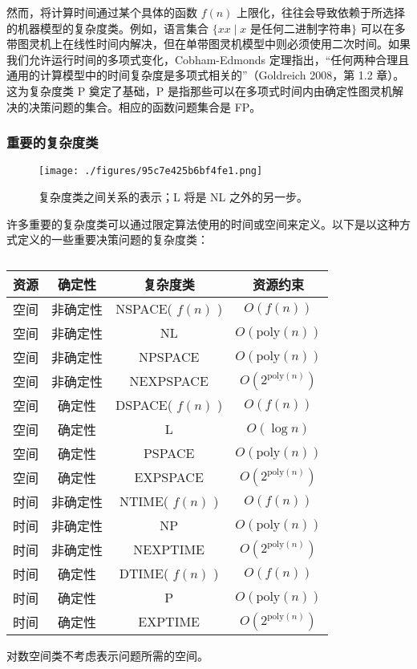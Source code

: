 然而，将计算时间通过某个具体的函数 \( f(n) \) 上限化，往往会导致依赖于所选择的机器模型的复杂度类。例如，语言集合 \(\{xx \mid x \text{ 是任何二进制字符串} \}\) 可以在多带图灵机上在线性时间内解决，但在单带图灵机模型中则必须使用二次时间。如果我们允许运行时间的多项式变化，Cobham-Edmonds 定理指出，“任何两种合理且通用的计算模型中的时间复杂度是多项式相关的”（Goldreich 2008，第 1.2 章）。这为复杂度类 P 奠定了基础，P 是指那些可以在多项式时间内由确定性图灵机解决的决策问题的集合。相应的函数问题集合是 FP。
\subsubsection{重要的复杂度类}
\begin{figure}[ht]
\centering
\texttt{[image: ./figures/95c7e425b6bf4fe1.png]}
\caption{复杂度类之间关系的表示；L 将是 NL 之外的另一步。} \label{fig_JSFZ_5}
\end{figure}
许多重要的复杂度类可以通过限定算法使用的时间或空间来定义。以下是以这种方式定义的一些重要决策问题的复杂度类：
\begin{table}[ht]
\centering
\caption\label{JSFZ}
\begin{tabular}{|c|c|c|c|}
\hline
\textbf{资源} & \textbf{确定性} & \textbf{复杂度类} & \textbf{资源约束}  \\
\hline 空间 & 非确定性 & NSPACE( \( f(n) \) ) &  \( O(f(n)) \)\\
\hline 空间 & 非确定性 & NL & \( O(\text{poly}(n)) \)\\
\hline 空间 & 非确定性 & NPSPACE & \( O(\text{poly}(n)) \)\\
\hline 空间 & 非确定性 & NEXPSPACE & \( O(2^{\text{poly}(n)}) \)\\
\hline 空间 & 确定性 & DSPACE( \( f(n) \) ) & \( O(f(n)) \)\\
\hline 空间 & 确定性 & L & \( O(\log n) \)\\
\hline 空间 & 确定性 & PSPACE & \( O(\text{poly}(n)) \)\\
\hline 空间 & 确定性 & EXPSPACE & \( O(2^{\text{poly}(n)}) \)\\
\hline 时间 & 非确定性 & NTIME( \( f(n) \) ) & \( O(f(n)) \) \\ 
\hline 时间 & 非确定性 & NP & \( O(\text{poly}(n)) \)\\ 
\hline 时间 & 非确定性 & NEXPTIME & \( O(2^{\text{poly}(n)}) \)\\ 
\hline 时间 & 确定性 & DTIME( \( f(n) \) ) & \( O(f(n)) \)\\ 
\hline 时间 & 确定性 & P & \( O(\text{poly}(n)) \)\\
\hline 时间 & 确定性 & EXPTIME & \( O(2^{\text{poly}(n)}) \)\\
\hline 
\end{tabular}
\end{table}
对数空间类不考虑表示问题所需的空间。

